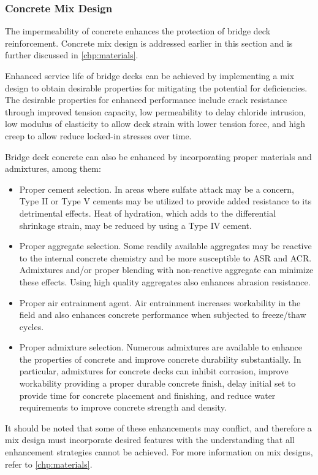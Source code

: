\subsubsection{Concrete Mix Design}
The impermeability of concrete enhances the protection of bridge deck reinforcement. Concrete mix design is
addressed earlier in this section and is further discussed in \cref{chp:materials}.

Enhanced service life of bridge decks can be achieved by implementing a mix design to obtain desirable
properties for mitigating the potential for deficiencies. The desirable properties for enhanced performance include
crack resistance through improved tension capacity, low permeability to delay chloride intrusion, low modulus of
elasticity to allow deck strain with lower tension force, and high creep to allow reduce locked-in stresses over time.

Bridge deck concrete can also be enhanced by incorporating proper materials and admixtures, among them:
\begin{itemize}
  \item Proper cement selection. In areas where sulfate attack may be a concern, Type II or Type V cements may be
  utilized to provide added resistance to its detrimental effects. Heat of hydration, which adds to the
  differential shrinkage strain, may be reduced by using a Type IV cement.
  \item Proper aggregate selection. Some readily available aggregates may be reactive to the internal concrete
  chemistry and be more susceptible to ASR and ACR. Admixtures and/or proper blending with non-reactive
  aggregate can minimize these effects. Using high quality aggregates also enhances abrasion resistance.
  \item Proper air entrainment agent. Air entrainment increases workability in the field and also enhances concrete
  performance when subjected to freeze/thaw cycles.
  \item Proper admixture selection. Numerous admixtures are available to enhance the properties of concrete and
  improve concrete durability substantially. In particular, admixtures for concrete decks can inhibit corrosion,
  improve workability providing a proper durable concrete finish, delay initial set to provide time for concrete
  placement and finishing, and reduce water requirements to improve concrete strength and density.
\end{itemize}

It should be noted that some of these enhancements may conflict, and therefore a mix design must incorporate
desired features with the understanding that all enhancement strategies cannot be achieved. For more information on
mix designs, refer to \cref{chp:materials}.

